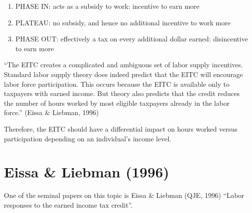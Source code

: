 \documentclass[
  letterpaper,
  DIV=11,
  numbers=noendperiod]{scrreprt}
\providecommand{\tightlist}{%
  \setlength{\itemsep}{0pt}\setlength{\parskip}{0pt}}\usepackage{longtable,booktabs,array}
\theoremstyle{definition}
\theoremstyle{remark}
\begin{document}
\begin{enumerate}
\def\labelenumi{\arabic{enumi}.}
\tightlist
\item
  PHASE IN: acts as a subsidy to work: incentive to earn more
\item
  PLATEAU: no subsidy, and hence no additional incentive to work more
\item
  PHASE OUT: effectively a tax on every additional dollar earned:
  disincentive to earn more
\end{enumerate}

\begin{tcolorbox}[enhanced jigsaw, breakable, colframe=quarto-callout-note-color-frame, toptitle=1mm, toprule=.15mm, opacitybacktitle=0.6, opacityback=0, rightrule=.15mm, titlerule=0mm, colback=white, bottomtitle=1mm, title={Note}, arc=.35mm, coltitle=black, colbacktitle=quarto-callout-note-color!10!white, leftrule=.75mm, bottomrule=.15mm, left=2mm]

``The EITC creates a complicated and ambiguous set of labor supply
incentives. Standard labor supply theory does indeed predict that the
EITC will encourage labor force participation. This occurs because the
EITC is available only to taxpayers with earned income. But theory also
predicts that the credit reduces the number of hours worked by most
eligible taxpayers already in the labor force.'' (Eissa \& Liebman,
1996)

\end{tcolorbox}

Therefore, the EITC should have a differential impact on hours worked
versus participation depending on an individual's income level.

\hypertarget{eissa-liebman-1996}{%
\section{Eissa \& Liebman (1996)}\label{eissa-liebman-1996}}

One of the seminal papers on this topic is Eissa \& Liebman (QJE, 1996)
``Labor responses to the earned income tax credit''.
\end{document}
